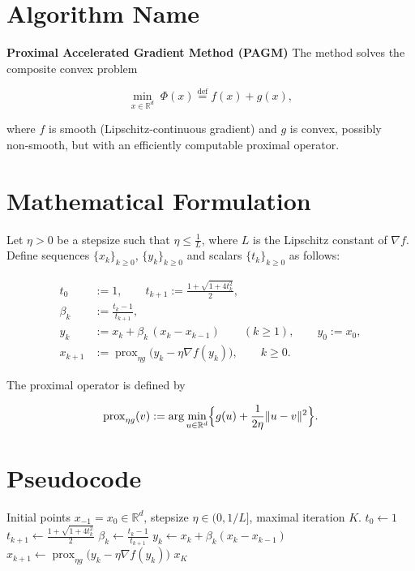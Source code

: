 \documentclass{article}
\newcommand{\prox}{\operatorname{prox}}
\newcommand{\R}{\mathbb{R}}
\begin{document}
\section*{Algorithm Name}
\textbf{Proximal Accelerated Gradient Method (PAGM)}  
The method solves the composite convex problem  

\[
\min_{x\in\R^{d}}\; \Phi(x)\stackrel{\mathrm{def}}{=}f(x)+g(x),
\]

where $f$ is smooth (Lipschitz‑continuous gradient) and $g$ is convex, possibly non‑smooth, but with an efficiently computable proximal operator.

\section*{Mathematical Formulation}
Let $\eta>0$ be a stepsize such that $\eta\le \frac1L$, where $L$ is the Lipschitz constant of $\nabla f$.  
Define sequences $\{x_k\}_{k\ge 0}$, $\{y_k\}_{k\ge 0}$ and scalars $\{t_k\}_{k\ge 0}$ as follows:

\[
\begin{aligned}
t_0 &:=1, \qquad  t_{k+1}:=\frac{1+\sqrt{1+4t_k^{2}}}{2},\\[4pt]
\beta_k &:=\frac{t_k-1}{t_{k+1}},\\[4pt]
y_k &:=x_k+\beta_k\,(x_k-x_{k-1})\qquad (k\ge 1),\qquad y_0:=x_0,\\[4pt]
x_{k+1} &:=\prox_{\eta g}\!\bigl(y_k-\eta \nabla f(y_k)\bigr),\qquad k\ge 0 .
\end{aligned}
\tag{1}
\]

The proximal operator is defined by  

\[
\prox_{\eta g}(v):=\arg\min_{u\in\R^{d}}\Bigl\{g(u)+\frac{1}{2\eta}\|u-v\|^{2}\Bigr\}.
\]

\section*{Pseudocode}
\begin{algorithm}[H]
\caption{Proximal Accelerated Gradient Method}
\begin{algorithmic}[1]
\Require Initial points $x_{-1}=x_{0}\in\R^{d}$, stepsize $\eta\in(0,1/L]$, maximal iteration $K$.
\State $t_{0}\gets 1$
    \State $t_{k+1}\gets\frac{1+\sqrt{1+4t_{k}^{2}}}{2}$
    \State $\beta_{k}\gets\frac{t_{k}-1}{t_{k+1}}$
    \State $y_{k}\gets x_{k}+\beta_{k}(x_{k}-x_{k-1})$
    \State $x_{k+1}\gets\prox_{\eta g}\bigl(y_{k}-\eta\nabla f(y_{k})\bigr)$
\EndFor
\State \Return $x_{K}$
\end{algorithmic}
\end{algorithm}
\end{document}
